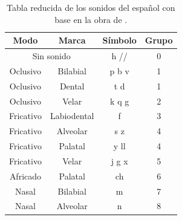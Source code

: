\begin{table}[H]
	\centering
	\caption{Tabla reducida de los sonidos del español con base en la obra de \cite{hualde2013sonidos}.}
	\label{tb:codsound}
\begin{tabular}{|c|c|c|c|}
	\hline
	\textbf{Modo} & \textbf{Marca} & \textbf{Símbolo} & \textbf{Grupo} \\ \hline
	\multicolumn{2}{|c|}{Sin sonido}                                                   & h /\textipa{2}/  & 0                               \\ \hline
	Oclusivo                                & Bilabial                                 & p b v                             & 1                               \\ \hline
	Oclusivo                                & Dental                                   & t d                               & 1                               \\ \hline
	Oclusivo                                & Velar                                    & k q g                             & 2                               \\ \hline
	Fricativo                               & Labiodental                              & f                                 & 3                               \\ \hline
	Fricativo                               & Alveolar                                 & s z                               & 4                               \\ \hline
	Fricativo                               & Palatal                                  & y ll                              & 4                               \\ \hline
	Fricativo                               & Velar                                    & j g x                             & 5                               \\ \hline
	Africado                                & Palatal                                  & ch                                & 6                               \\ \hline
	Nasal                                   & Bilabial                                 & m                                 & 7                               \\ \hline
	Nasal                                   & Alveolar                                 & n                                 & 8                               \\ \hline

\end{tabular}
\end{table}
